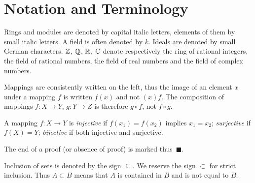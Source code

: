 \chapter*{Notation and Terminology}
{}

Rings and modules are denoted by capital italic letters, elements of them by small italic letters. A field is often denoted by $k$. Ideals are denoted by small German characters. $\mathbb{Z}$, $\mathbb{Q}$, $\mathbb{R}$, $\mathbb{C}$ denote respectively the ring of rational integers, the field of rational numbers, the field of real numbers and the field of complex numbers.

Mappings are consistently written on the left, thus the image of an element $x$ under a mapping $f$ is written $f(x)$ and not $(x)f$. The composition of mappings $f \colon X \to Y$, $g \colon Y \to Z$ is therefore $g \circ f$, not $f \circ g$.

A mapping $f \colon X \to Y$ is \emph{injective} if $f(x_1) = f(x_2)$ implies $x_1 = x_2$; \emph{surjective} if $f(X) = Y$; \emph{bijective} if both injective and surjective.

The end of a proof (or absence of proof) is marked thus~$\blacksquare$.

Inclusion of sets is denoted by the sign $\subseteq$. We reserve the sign $\subset$ for strict inclusion. Thus $A \subset B$ means that $A$ is contained in $B$ and is not equal to $B$.
